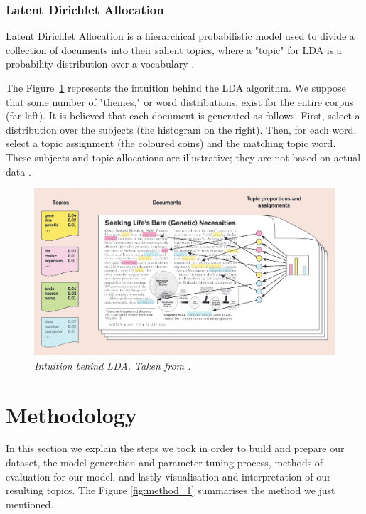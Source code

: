 \documentclass[twoside,12pt,a4paper]{article}
\begin{document}
\subsubsection{Latent Dirichlet Allocation}
Latent Dirichlet Allocation is a hierarchical probabilistic model used to divide a collection of documents into their salient topics, where a "topic" for LDA is a probability distribution over a vocabulary \citep{blei_probabilistic_2012}.

The Figure~\ref{fig:lda} represents the intuition behind the LDA algorithm. We suppose that some number of "themes," or word distributions, exist for the entire corpus (far left).
It is believed that each document is generated as follows. First, select a distribution over the subjects (the histogram on the right). Then, for each word, select a topic assignment (the coloured coins) and the matching topic word. These subjects and topic allocations are illustrative; they are not based on actual data \citep{blei_probabilistic_2012}.

\begin{figure}[h]
\centering
\includegraphics[scale=0.4]{lda.png}
\caption{\textit{Intuition behind LDA. Taken from \citep{blei_probabilistic_2012}.}}
\label{fig:lda}
\end{figure}

\clearpage
\section{Methodology}
In this section we explain the steps we took in order to build and prepare our dataset, the model generation and parameter tuning process, methods of evaluation for our model, and lastly visualisation and interpretation of our resulting topics. The Figure \ref{fig:method_1} summarises the method we just mentioned.\\
\end{document}
